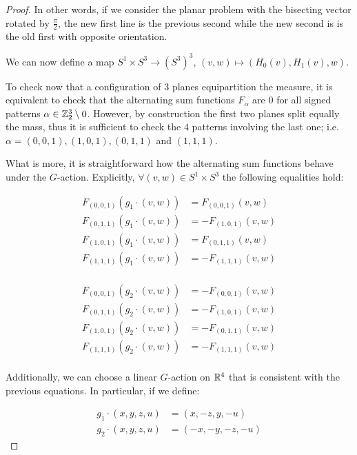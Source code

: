 \documentclass[10pt]{article}
\begin{document}
\begin{proof}
  In other words, if we consider the planar problem with the bisecting vector rotated by $\frac{\pi}{2}$, the new first line is the previous second while the new second is
  is the old first with opposite orientation.

  We can now define a map $S^1\times S^3 \rightarrow (S^3)^3$, $(v, w) \mapsto (H_0(v), H_1(v), w)$.

  To check now that a configuration of $3$ planes equipartition the measure, it is equivalent to check that the alternating sum functions $F_\alpha$ are $0$ for all signed
  patterns $\alpha\in \mathbb{Z}_2^3 \setminus 0$. However, by construction the first two planes split equally the mass, thus it is sufficient to check the $4$
  patterns involving the last one; i.e. $\alpha = (0,0,1), (1,0,1), (0,1,1)$ and $(1,1,1)$.

  What is more, it is straightforward  how the alternating sum functions behave under the $G$-action.
  Explicitly, $\forall (v,w)\in S^1\times S^3$ the following equalities hold:

  \begin{align*}
    F_{(0,0,1)}(g_1\cdot (v,w)) &=  F_{(0,0,1)}(v,w)\\
    F_{(0,1,1)}(g_1\cdot (v,w)) &=   - F_{(1,0,1)}(v,w)\\
    F_{(1,0,1)}(g_1\cdot (v,w)) &=  F_{(0,1,1)}(v,w)\\
    F_{(1,1,1)}(g_1\cdot (v,w)) &=  - F_{(1,1,1)}(v,w)\\
  \end{align*}

  \begin{align*}
    F_{(0,0,1)}(g_2\cdot (v,w)) &=  - F_{(0,0,1)}(v,w)\\
    F_{(0,1,1)}(g_2\cdot (v,w)) &=  - F_{(1,0,1)}(v,w)\\
    F_{(1,0,1)}(g_2\cdot (v,w)) &=  - F_{(0,1,1)}(v,w)\\
    F_{(1,1,1)}(g_2\cdot (v,w)) &=  - F_{(1,1,1)}(v,w)\\
  \end{align*}

  Additionally, we can choose a linear $G$-action on $\mathbb{R}^4$ that is consistent with the previous equations. In particular, if we define:

  \begin{align*}
    g_1\cdot (x, y, z, u) &= (x, -z, y, -u)\\
    g_2 \cdot (x, y, z, u) &= (-x, -y, -z, -u)
  \end{align*}


\end{proof}
\end{document}

